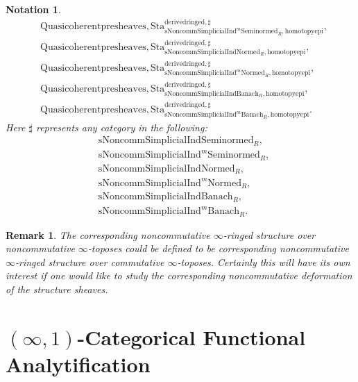 \documentclass[12pt]{book}
\newtheorem{remark}{Remark}
\newtheorem{notation}{Notation}
\begin{document}
\begin{notation}
\begin{align}
&\mathrm{Quasicoherentpresheaves,Sta}^\mathrm{derivedringed,\sharp}_{\mathrm{sNoncomm}\mathrm{Simplicial}\mathrm{Ind}^m\mathrm{Seminormed}_R,\mathrm{homotopyepi}},\\
&\mathrm{Quasicoherentpresheaves,Sta}^\mathrm{derivedringed,\sharp}_{\mathrm{sNoncomm}\mathrm{Simplicial}\mathrm{Ind}\mathrm{Normed}_R,\mathrm{homotopyepi}},\\
&\mathrm{Quasicoherentpresheaves,Sta}^\mathrm{derivedringed,\sharp}_{\mathrm{sNoncomm}\mathrm{Simplicial}\mathrm{Ind}^m\mathrm{Normed}_R,\mathrm{homotopyepi}},\\
&\mathrm{Quasicoherentpresheaves,Sta}^\mathrm{derivedringed,\sharp}_{\mathrm{sNoncomm}\mathrm{Simplicial}\mathrm{Ind}\mathrm{Banach}_R,\mathrm{homotopyepi}},\\
&\mathrm{Quasicoherentpresheaves,Sta}^\mathrm{derivedringed,\sharp}_{\mathrm{sNoncomm}\mathrm{Simplicial}\mathrm{Ind}^m\mathrm{Banach}_R,\mathrm{homotopyepi}}.	
\end{align}
Here $\sharp$ represents any category in the following:
\begin{align}
&\mathrm{sNoncomm}\mathrm{Simplicial}\mathrm{Ind}\mathrm{Seminormed}_R,\\
&\mathrm{sNoncomm}\mathrm{Simplicial}\mathrm{Ind}^m\mathrm{Seminormed}_R,\\
&\mathrm{sNoncomm}\mathrm{Simplicial}\mathrm{Ind}\mathrm{Normed}_R,\\
&\mathrm{sNoncomm}\mathrm{Simplicial}\mathrm{Ind}^m\mathrm{Normed}_R,\\
&\mathrm{sNoncomm}\mathrm{Simplicial}\mathrm{Ind}\mathrm{Banach}_R,\\
&\mathrm{sNoncomm}\mathrm{Simplicial}\mathrm{Ind}^m\mathrm{Banach}_R.	
\end{align} 
\end{notation}


\begin{remark}
The corresponding noncommutative $\infty$-ringed structure over noncommutative $\infty$-toposes could be defined to be corresponding noncommutative $\infty$-ringed structure over commutative $\infty$-toposes. Certainly this will have its own interest if one would like to study the corresponding noncommutative deformation of the structure sheaves.	
\end{remark}



\chapter{$(\infty,1)$-Categorical Functional Analytification}
\end{document}
